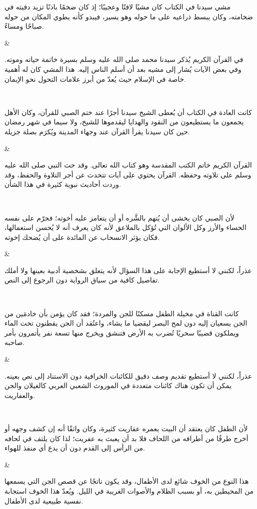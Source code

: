 \ragtableheader
\parbox[t]{\rcw}{\raggedleft\small\textarabic{مشي سيدنا في الكتاب كان مشيًا لافتًا وعجيبًا؛ إذ كان ضخمًا بادنًا تزيد دفيته في ضخامته، وكان يبسط ذراعيه على ما حوله وهو يسير، فيبدو كأنه يطوي المكان من حوله صباحًا ومساءً.}}&\parbox[t]{\rcw}{\raggedleft\small\textarabic{في القرآن الكريم يُذكر سيدنا محمد صلى الله عليه وسلم بسيرة خاتمة حياته وموته. وفي بعض الآيات يُشار إلى مشيه بعد أن أسلم الناس إليه. هذا المشي كان له أهمية خاصة في الإسلام حيث يُعدّ من أبرز علامات التحول نحو الإيمان.}}\\
\ragtablefooter

\ragtableheader
\parbox[t]{\rcw}{\raggedleft\small\textarabic{كانت العادة في الكتاب أن يُعطى الشيخ سيدنا أجرًا عند ختم الصبي للقرآن، وكان الأهل يجمعون ما يستطيعون من النقود والهدايا ليقدموها للشيخ، ولا سيما في شهر رمضان حين كان سيدنا يقرأ القرآن عند وجهاء المدينة ويُكرَم بصلة جزيلة.}}&\parbox[t]{\rcw}{\raggedleft\small\textarabic{القرآن الكريم خاتم الكتب المقدسة وهو كتاب الله تعالى. وقد حث النبي صلى الله عليه وسلم على تلاوته وحفظه. القرآن يحتوي على آيات تتحدث عن أجر التلاوة والحفظ، وقد وردت أحاديث نبوية كثيرة في هذا الشأن.}}\\
\ragtablefooter

\ragtableheader
\parbox[t]{\rcw}{\raggedleft\small\textarabic{لأن الصبي كان يخشى أن يُتهم بالشَّره أو أن يتغامز عليه أخوته؛ فحرّم على نفسه الحساء والأرز وكل الألوان التي تُؤكل بالملاعق لأنه كان يعرف أنه لا يُحسن استعمالها، فكان يؤثر الانسحاب عن المائدة على أن يُضحك إخوته.}}&\parbox[t]{\rcw}{\raggedleft\small\textarabic{عذراً، لكنني لا أستطيع الإجابة على هذا السؤال لأنه يتعلق بشخصية أدبية بعينها ولا أملك تفاصيل كافية من سياق الرواية دون الرجوع إلى النص.}}\\
\ragtablefooter

\ragtableheader
\parbox[t]{\rcw}{\raggedleft\small\textarabic{كانت القناة في مخيلة الطفل مسكنًا للجن والمردة؛ فقد كان يؤمن بأن خادمَين من الجن يسعيان إليه دون لمح البصر ليقضيا ما يشاء، واعتُقد أن الجن يقطنون تحت الماء ويملكون قضيبًا سحريًا تُضرب به الأرض فتنشق ويخرج منها تسعة نفر يأتمرون بأمر صاحبه.}}&\parbox[t]{\rcw}{\raggedleft\small\textarabic{عذراً، لكنني لا أستطيع تقديم وصف دقيق للكائنات الخرافية دون الاستناد إلى نص بعينه. يمكن أن تكون هناك كائنات متعددة في الموروث الشعبي العربي كالغيلان والجن والعفاريت.}}\\
\ragtablefooter

\ragtableheader
\parbox[t]{\rcw}{\raggedleft\small\textarabic{لأن الطفل كان يعتقد أن البيت يعمره عفاريت كثيرة، وكان واثقًا أنه إن كشف وجهه أو أخرج طرفًا من أطرافه من اللحاف فلا بد أن يعبث به عفريت؛ لذا كان يلتف في لحافه من الرأس إلى القدم دون أن يدع أي منفذ للهواء.}}&\parbox[t]{\rcw}{\raggedleft\small\textarabic{هذا النوع من الخوف شائع لدى الأطفال، وقد يكون ناتجًا عن قصص الجن التي يسمعها من المحيطين به، أو بسبب الظلام والأصوات الغريبة في الليل. ويُعدّ هذا الخوف استجابة نفسية طبيعية لدى الأطفال.}}\\
\ragtablefooter


